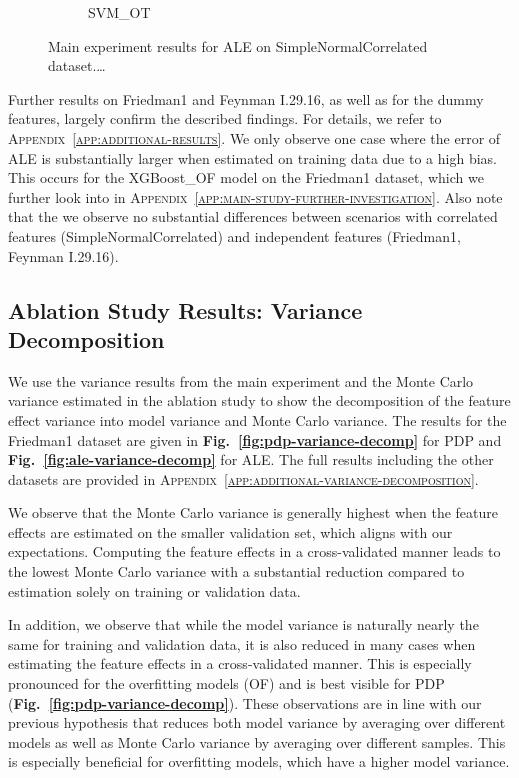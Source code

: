 \documentclass[runningheads]{llncs}
\begin{document}
\begin{figure}[htbp]
\begin{subfigure}[b]{0.49\textwidth}
        \caption{SVM\_OT}
        \label{fig:ale-results-snc-svm-ot}  %
    \end{subfigure}
    \caption{Main experiment results for ALE on SimpleNormalCorrelated dataset.\dots}
    \label{fig:ale-results-snc}  %
\end{figure}

Further results on Friedman1 and Feynman I.29.16, as well as for the dummy features, largely confirm
the described findings. For details, we refer to \textsc{Appendix~\ref{app:additional-results}}. We only
observe one case where the error of ALE is substantially larger when estimated on training data
due to a high bias. This occurs for the XGBoost\_OF model on the Friedman1 dataset, which we further
look into in \textsc{Appendix~\ref{app:main-study-further-investigation}}. Also note that the we observe
no substantial differences between scenarios with correlated features (SimpleNormalCorrelated) and
independent features (Friedman1, Feynman I.29.16).

\subsection{Ablation Study Results: Variance Decomposition}\label{sec:results-variance-decomposition}

We use the variance results from the main experiment and the Monte Carlo variance estimated in the ablation study
to show the decomposition of the feature effect variance into model variance and Monte Carlo variance. The results
for the Friedman1 dataset are given in \textbf{Fig.\@~\ref{fig:pdp-variance-decomp}} for PDP and
\textbf{Fig.\@~\ref{fig:ale-variance-decomp}} for ALE. The full results including the other datasets are  %
provided in \textsc{Appendix~\ref{app:additional-variance-decomposition}}.

We observe that the Monte Carlo variance is generally highest when the feature effects are estimated on the smaller
validation set, which aligns with our expectations.
Computing the feature effects in a cross-validated manner leads to the lowest Monte Carlo variance with a substantial
reduction compared to estimation solely on training or validation data.

In addition, we observe that while the model variance is naturally nearly the same for training and validation data,
it is also reduced in many cases when estimating the feature effects in a
cross-validated manner. This is especially pronounced for the overfitting models (OF) and is best visible for PDP
(\textbf{Fig.\@~\ref{fig:pdp-variance-decomp}}). These observations are in line with our previous hypothesis that
reduces both model variance by averaging over different models as well as Monte Carlo variance by averaging over
different samples. This is especially beneficial for overfitting models, which have a higher model variance.
\end{document}
